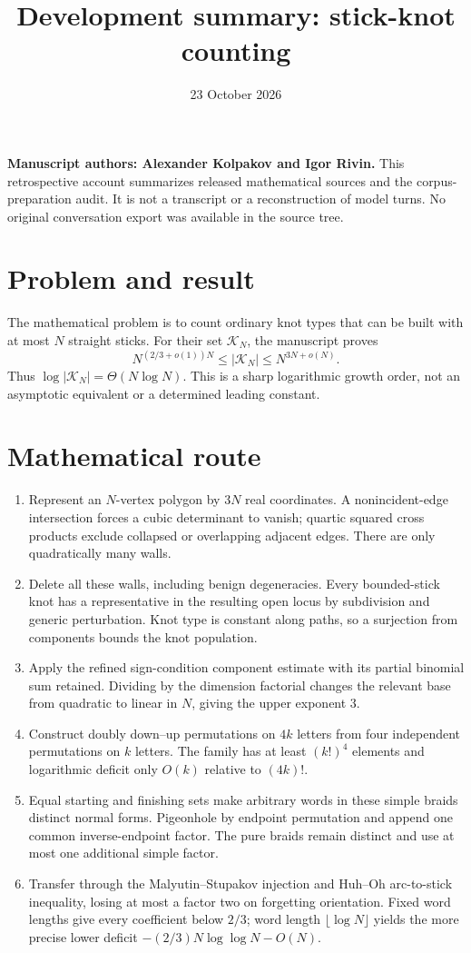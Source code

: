 \documentclass[11pt]{article}
\title{Development summary: stick-knot counting}
\author{}
\date{23 October 2026}
\begin{document}
\maketitle
\noindent\textbf{Manuscript authors: Alexander Kolpakov and Igor Rivin.}
This retrospective account summarizes released mathematical sources and the
corpus-preparation audit. It is not a transcript or a reconstruction of model
turns. No original conversation export was available in the source tree.

\section*{Problem and result}
The mathematical problem is to count ordinary knot types that can be built
with at most $N$ straight sticks. For their set $\mathcal K_N$, the manuscript
proves
\[
 N^{(2/3+o(1))N}\le |\mathcal K_N|\le N^{3N+o(N)}.
\]
Thus $\log |\mathcal K_N|=\Theta(N\log N)$. This is a sharp logarithmic
growth order, not an asymptotic equivalent or a determined leading constant.

\section*{Mathematical route}
\begin{enumerate}
\item Represent an $N$-vertex polygon by $3N$ real coordinates. A
  nonincident-edge intersection forces a cubic determinant to vanish;
  quartic squared cross products exclude collapsed or overlapping adjacent
  edges. There are only quadratically many walls.
\item Delete all these walls, including benign degeneracies. Every
  bounded-stick knot has a representative in the resulting open locus by
  subdivision and generic perturbation. Knot type is constant along paths,
  so a surjection from components bounds the knot population.
\item Apply the refined sign-condition component estimate with its partial
  binomial sum retained. Dividing by the dimension factorial changes the
  relevant base from quadratic to linear in $N$, giving the upper exponent 3.
\item Construct doubly down--up permutations on $4k$ letters from four
  independent permutations on $k$ letters. The family has at least $(k!)^4$
  elements and logarithmic deficit only $O(k)$ relative to $(4k)!$.
\item Equal starting and finishing sets make arbitrary words in these
  simple braids distinct normal forms. Pigeonhole by endpoint permutation
  and append one common inverse-endpoint factor. The pure braids remain
  distinct and use at most one additional simple factor.
\item Transfer through the Malyutin--Stupakov injection and Huh--Oh
  arc-to-stick inequality, losing at most a factor two on forgetting
  orientation. Fixed word lengths give every coefficient below $2/3$;
  word length $\lfloor\log N\rfloor$ yields the more precise lower deficit
  $-(2/3)N\log\log N-O(N)$.
\end{enumerate}
\end{document}
